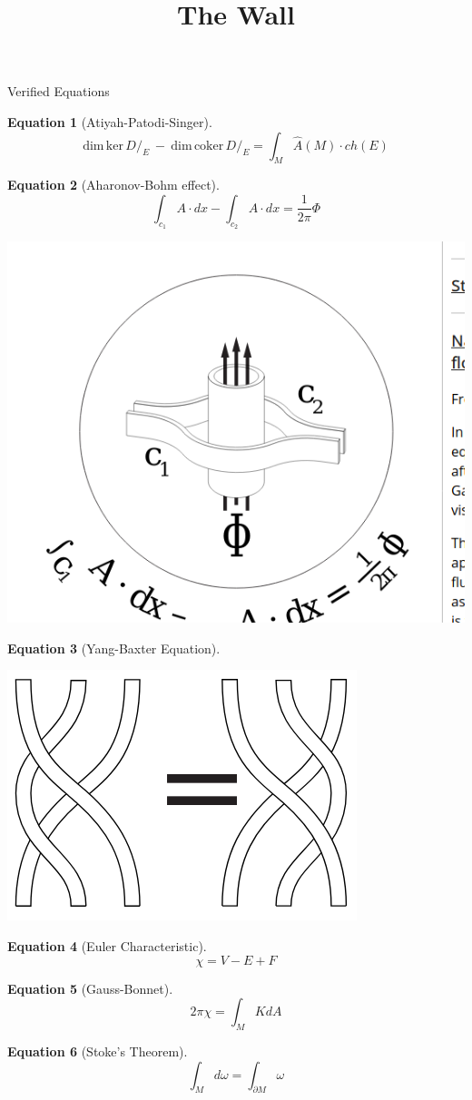 \documentclass{article}
\theoremstyle{definition}
\newtheorem{equation1}{Equation}
\begin{document}
\title{The Wall}
\date{}
\maketitle

\begin{section}{Verified Equations}

  \begin{equation1}[Atiyah-Patodi-Singer]
    $$\text{dim}\, \text{ker}\, {D \!\!\!\!\big /_E}\ - \ \text{dim} \, \text{coker}\, {D \!\!\!\!\big /_E} = \int_M \hat{A}(M) \cdot ch(E)$$
  \end{equation1}

  \begin{equation1}[Aharonov-Bohm effect]
    $$\int_{c_1} A \cdot dx - \int_{c_2} A \cdot dx = \frac{1}{2\pi} \Phi$$
    \newline
    \begin{center}
      \includegraphics[width=0.20\linewidth]{./abohm.png}
    \end{center}
  \end{equation1}

  \begin{equation1}[Yang-Baxter Equation]
    $\;$
    \newline
    \begin{center}
      \includegraphics[width=0.15\linewidth]{./yang-baxter.png}
    \end{center}
  \end{equation1}

  \begin{equation1}[Euler Characteristic]
    $$ \chi = V - E + F $$
  \end{equation1}

  \begin{equation1}[Gauss-Bonnet]
    $$2\pi \chi = \int_M K dA$$
  \end{equation1}


	\begin{equation1}[Stoke's Theorem]
    $$\int_M d\omega = \int_{\partial M} \omega $$
  \end{equation1}


\end{section}
\end{document}
